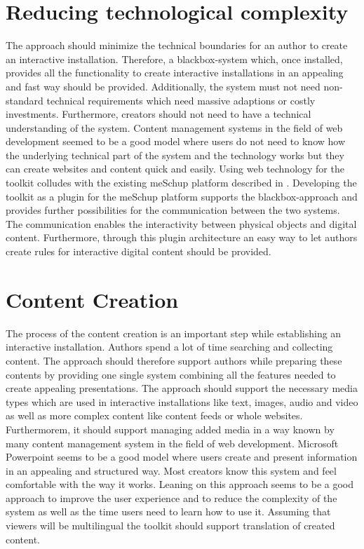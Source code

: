 \section{Reducing technological complexity}
The approach should minimize the technical boundaries for an author to create an interactive installation. Therefore, a blackbox-system which, once installed, provides all the functionality to create interactive installations in an appealing and fast way should be provided. Additionally, the system must not need non-standard technical requirements which need massive adaptions or costly investments. Furthermore, creators should not need to have a technical understanding of the system. Content management systems in the field of web development seemed to be a good model where users do not need to know how the underlying technical part of the system and the technology works but they can create websites and content quick and easily. Using web technology for the toolkit colludes with the existing meSchup platform described in \cite{Kubitza2015n}. Developing the toolkit as a plugin for the meSchup platform supports the blackbox-approach and provides further possibilities for the communication between the two systems. The communication enables the interactivity between physical objects and digital content. Furthermore, through this plugin architecture an easy way to let authors create rules for interactive digital content should be provided.

\section{Content Creation}
The process of the content creation is an important step while establishing an interactive installation. Authors spend a lot of time searching and collecting content. The approach should therefore support authors while preparing these contents by providing one single system combining all the features needed to create appealing presentations. The approach should support the necessary media types which are used in interactive installations like text, images, audio and video as well as more complex content like content feeds or whole websites. Furthermorem, it should support managing added media in a way known by many content management system in the field of web development. Microsoft Powerpoint seems to be a good model where users create and present information in an appealing and structured way. Most creators know this system and feel comfortable with the way it works. Leaning on this approach seems to be a good approach to improve the user experience and to reduce the complexity of the system as well as the time users need to learn how to use it.
Assuming that viewers will be multilingual the toolkit should support translation of created content. 
 
